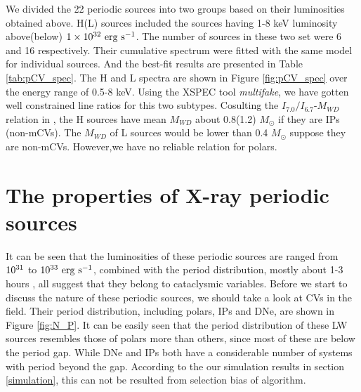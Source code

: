 \documentclass[twoside,twocolumn]{aastex63}
\begin{document}
We divided the 22 periodic sources into two groups based on their luminosities obtained above. H(L) sources included the sources having 1-8 keV luminosity above(below) $\rm 1 \times 10^{32}~erg ~s^{-1}$. The number of sources in these two set were 6 and 16 respectively. Their cumulative spectrum were fitted with the same model for individual sources. And the best-fit results are presented in Table \ref{tab:pCV_spec}. The H and L spectra are shown in Figure \ref{fig:pCV_spec} over the energy range of 0.5-8 keV. Using the XSPEC tool \emph{multifake}, we have gotten well constrained line ratios for this two subtypes. Cosulting the $I_{7.0}/I_{6.7}$-$M_{WD}$ relation in \citet{2019ApJ...882..164X}, the H sources have mean $M_{WD}$ about 0.8(1.2) $M_\odot$ if they are IPs (non-mCVs). The $M_{WD}$ of L sources would be lower than 0.4 $M_\odot$ suppose they are non-mCVs. However,we have no reliable relation for polars.




\section{The properties of X-ray periodic sources}\label{sec:properties}
It can be seen that the luminosities of these periodic sources are ranged from $\rm 10^{31}$ to $\rm 10^{33}~erg~s^{-1}$, combined with the period distribution, mostly about 1-3 hours , all suggest that they belong to cataclysmic variables. 
Before we start to discuss the nature of these periodic sources, we should take a look at CVs in the field. Their period distribution, including polars, IPs and DNe, are shown in Figure \ref{fig:N_P}.
It can be easily seen that the period distribution of these LW sources resembles those of polars more than others, since most of these are below the period gap. While DNe and IPs both have a considerable number of systems with period beyond the gap. According to the our simulation results in section \ref{simulation}, this can not be resulted from selection bias of algorithm. 
\end{document}
